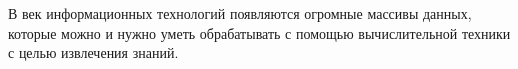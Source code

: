 \label{sec:intro}

В век информационных технологий появляются огромные массивы данных, которые можно и нужно уметь обрабатывать с помощью вычислительной техники с целью извлечения знаний.
